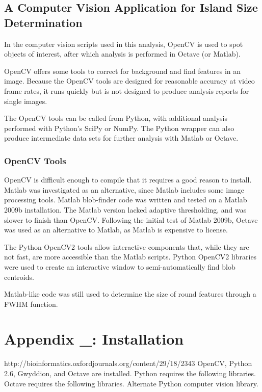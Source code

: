 \documentclass[12pt,oneside,english]{article}
\begin{document}
	\subsection{A Computer Vision Application for Island Size Determination}
	
	In the computer vision scripts used in this analysis, OpenCV is used to spot objects of interest, 
	after which analysis is performed in Octave (or Matlab).
	
	
	OpenCV offers some tools to correct for background and find features in an image.  	
	Because the OpenCV tools are designed for reasonable accuracy at video frame rates, 
	it runs quickly but is not designed to produce analysis reports for single images.  
	
	The OpenCV tools can be called from Python, with additional analysis performed with Python's SciPy or NumPy.  
	The Python wrapper can also produce intermediate data sets for further analysis with Matlab or Octave.

	\subsubsection{OpenCV Tools}	
	
	OpenCV is difficult enough to compile that it requires a good reason to install.  
	Matlab was investigated as an alternative, since Matlab includes some image processing tools.
	Matlab blob-finder code was written and tested on a Matlab 2009b installation.  
	The Matlab version lacked adaptive thresholding, and was slower to finish than OpenCV. 
	Following the initial test of Matlab 2009b, Octave was used as an alternative to Matlab, 
	as Matlab is expensive to license.  
	
	The Python OpenCV2 tools allow interactive components that, while they are not fast, 
	are more accessible than the Matlab scripts. 
	Python OpenCV2 libraries were used to create an interactive window to semi-automatically find blob centroids.
	
	Matlab-like code was still used to determine the size of round features through a FWHM function. 

\section{Appendix \_: Installation}
http://bioinformatics.oxfordjournals.org/content/29/18/2343
    OpenCV, Python 2.6, Gwyddion, and Octave are installed.
    Python requires the following libraries.
    Octave requires the following libraries.
    Alternate Python computer vision library.
\end{document}
